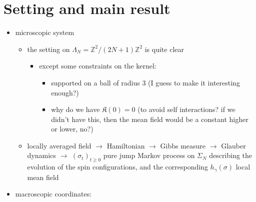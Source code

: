 \documentclass{report}
\theoremstyle{remark}
\theoremstyle{definition}
\let\epsilon\varepsilon
\begin{document}
\chapter{Setting and main result}
\begin{itemize}
  \item microscopic system
  \begin{itemize}
    \item the setting on $\Lambda_N = \mathbb{Z}^2 / (2N + 1)\mathbb{Z}^2$ is quite clear
    \begin{itemize}
      \item except some constraints on the kernel:
      \begin{itemize}
        \item supported on a ball of radius 3 (I guess to make it interesting enough?)
        \item why do we have $\mathfrak{K}(0) = 0$  (to avoid self interactions? if we didn't have this, then the mean field would be a constant higher or lower, no?)
      \end{itemize}
    \end{itemize}
    \item locally averaged field $\to$ Hamiltonian $\to$ Gibbs measure $\to$ Glauber dynamics $\to$ $(\sigma_t)_{t\ge 0}$ pure jump Markov process on $\Sigma_N$ describing the evolution of the spin configurations, and the corresponding $h_\gamma(\sigma)$ local mean field
  \end{itemize}
  \item macroscopic coordinates:
  \begin{itemize}

\end{itemize}
\end{itemize}
\end{document}
